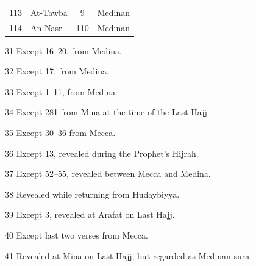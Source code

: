 \documentclass{article}
\renewcommand{\footnotesize}{\scriptsize}
\begin{document}
\begin{center}
\begin{multicols}{3}
\begin{threeparttable}
\begin{tabular}{@{}r l c l@{}}
                113           & At-Tawba\tnote{40}    & 9            & Medinan       \\
                114           & An-Nasr\tnote{41}     & 110          & Medinan       \\
            \end{tabular}
            \begin{tablenotes}
                \footnotesize
                \item[31] Except 16--20, from Medina.
                \item[32] Except 17, from Medina.
                \item[33] Except 1--11, from Medina.
                \item[34] Except 281 from Mina at the time of the Last Hajj.
                \item[35] Except 30--36 from Mecca.
                \item[36] Except 13, revealed during the Prophet's Hijrah.
                \item[37] Except 52--55, revealed between Mecca and Medina.
                \item[38] Revealed while returning from Hudaybiyya.
                \item[39] Except 3, revealed at Arafat on Last Hajj.
                \item[40] Except last two verses from Mecca.
                \item[41] Revealed at Mina on Last Hajj, but regarded as Medinan sura.
            \end{tablenotes}
        \end{threeparttable}

    \end{multicols}
\end{center}

\vspace*{\fill}
\noindent
\end{document}
